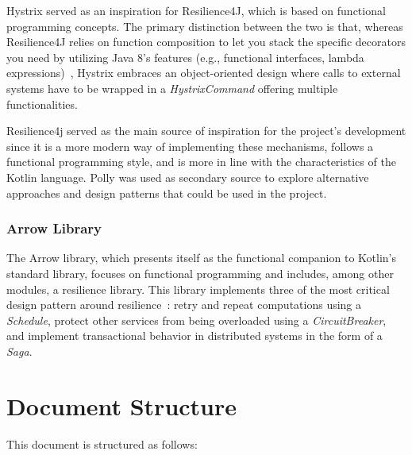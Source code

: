 Hystrix served as an inspiration for Resilience4J, which is based on functional programming concepts.
The primary distinction between the two is that, whereas Resilience4J relies on function composition to let you stack the specific decorators you need by utilizing Java 8's features (e.g., functional interfaces, lambda expressions)~\cite{resilience4j-vs-hystrix}, Hystrix embraces an object-oriented design where calls to external systems have to be wrapped in a \textit{HystrixCommand} offering multiple functionalities.

Resilience4j served as the main source of inspiration for the project's development since it is a more modern way of implementing these mechanisms, follows a functional programming style, and is more in line with the characteristics of the Kotlin language.
Polly was used as secondary source to explore alternative approaches and design patterns that could be used in the project.

\subsubsection{Arrow Library}

The Arrow library, which presents itself as the functional companion to Kotlin's standard library, focuses on functional programming and includes, among other modules, a resilience library.
This library implements three of the most critical design pattern around resilience~\cite{arrow-resilience}: retry and repeat computations using a \textit{Schedule}, protect other services from being overloaded using a \textit{CircuitBreaker}, and implement transactional behavior in distributed systems in the form of a \textit{Saga}.


\section{Document Structure}\label{sec:document-structure}

This document is structured as follows:

